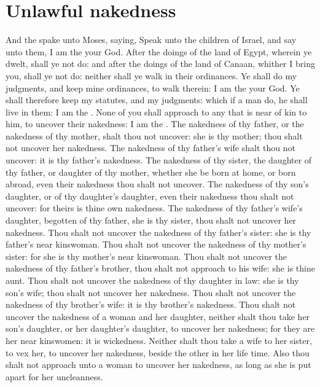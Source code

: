 \section*{Unlawful nakedness}
\begin{biblechapter} %
\verse And the \LORD spake unto Moses, saying,
\verse Speak unto the children of Israel, and say unto them, I am the \LORD your God.
\verse After the doings of the land of Egypt, wherein ye dwelt, shall ye not do: and after the doings of the land of Canaan, whither I bring you, shall ye not do: neither shall ye walk in their ordinances.
\verse Ye shall do my judgments, and keep mine ordinances, to walk therein: I am the \LORD your God.
\verse Ye shall therefore keep my statutes, and my judgments: which if a man do, he shall live in them: I am the \LORD.
\verse None of you shall approach to any that is near of kin to him, to uncover their nakedness: I am the \LORD.
\verse The nakedness of thy father, or the nakedness of thy mother, shalt thou not uncover: she is thy mother; thou shalt not uncover her nakedness.
\verse The nakedness of thy father's wife shalt thou not uncover: it is thy father's nakedness.
\verse The nakedness of thy sister, the daughter of thy father, or daughter of thy mother, whether she be born at home, or born abroad, even their nakedness thou shalt not uncover.
\verse The nakedness of thy son's daughter, or of thy daughter's daughter, even their nakedness thou shalt not uncover: for theirs is thine own nakedness.
\verse The nakedness of thy father's wife's daughter, begotten of thy father, she is thy sister, thou shalt not uncover her nakedness.
\verse Thou shalt not uncover the nakedness of thy father's sister: she is thy father's near kinswoman.
\verse Thou shalt not uncover the nakedness of thy mother's sister: for she is thy mother's near kinswoman.
\verse Thou shalt not uncover the nakedness of thy father's brother, thou shalt not approach to his wife: she is thine aunt.
\verse Thou shalt not uncover the nakedness of thy daughter in law: she is thy son's wife; thou shalt not uncover her nakedness.
\verse Thou shalt not uncover the nakedness of thy brother's wife: it is thy brother's nakedness.
\verse Thou shalt not uncover the nakedness of a woman and her daughter, neither shalt thou take her son's daughter, or her daughter's daughter, to uncover her nakedness; for they are her near kinswomen: it is wickedness.
\verse Neither shalt thou take a wife to her sister, to vex her, to uncover her nakedness, beside the other in her life time.
\verse Also thou shalt not approach unto a woman to uncover her nakedness, as long as she is put apart for her uncleanness.

\end{biblechapter}
